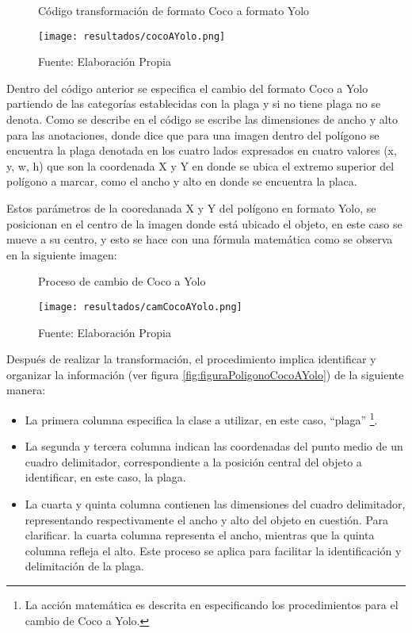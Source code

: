 \begin{figure}[h]
\centering
\caption{Código transformación de formato Coco a formato Yolo}
\texttt{[image: resultados/cocoAYolo.png]}
\caption*{\footnotesize Fuente: Elaboración Propia}
\label{fig:figuraCocoAYolo}
\end{figure}

\newpage

Dentro del código anterior se especifica el cambio del formato Coco a Yolo partiendo de las categorías establecidas con la plaga y si no tiene plaga no se denota. Como se describe en el código se escribe las dimensiones de ancho y alto para las anotaciones, donde dice que para una imagen dentro del polígono se encuentra la plaga denotada en los cuatro lados expresados en cuatro valores (x, y, w, h) que son la coordenada X y Y en donde se ubica el extremo superior del polígono a marcar, como el ancho y alto en donde se encuentra la placa.

Estos parámetros de la cooredanada X y Y del polígono en formato Yolo, se posicionan en el centro de la imagen donde está ubicado el objeto, en este caso se mueve a su centro, y esto se hace con una fórmula matemática  como se observa en la siguiente imagen:


\begin{figure}[h]
\centering
\caption{Proceso de cambio de Coco a Yolo}
\texttt{[image: resultados/camCocoAYolo.png]}
\caption*{\footnotesize Fuente: Elaboración Propia}
\label{fig:figuraCamCocoAYolo}
\end{figure}

Después de realizar la transformación, el procedimiento implica identificar y organizar la información (ver figura \ref{fig:figuraPoligonoCocoAYolo}) de la siguiente manera:
\begin{itemize}
    \item La primera columna especifica la clase a utilizar, en este caso, ``plaga'' \footnote{La acción matemática es descrita en \cite{rehman2022conversion} especificando los procedimientos para el cambio de Coco a Yolo.}. 
    \item La segunda y tercera columna indican las coordenadas del punto medio de un cuadro delimitador, correspondiente a la posición central del objeto a identificar, en este caso, la plaga. 
    \item La cuarta y quinta columna contienen las dimensiones del cuadro delimitador, representando respectivamente el ancho y alto del objeto en cuestión. Para clarificar. la cuarta columna representa el ancho, mientras que la quinta columna refleja el alto. Este proceso se aplica para facilitar la identificación y delimitación de la plaga.
\end{itemize}

